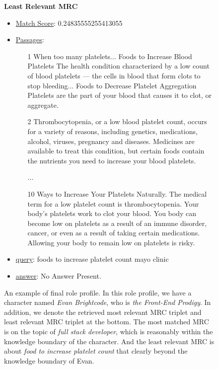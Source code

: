\begin{figure*}[!htbp]
\begin{tcolorbox}
\textbf{Least Relevant MRC}
\begin{itemize}
[leftmargin=*,noitemsep,topsep=0pt]
\item \underline{Match Score}: 0.24835555255413055
\item \underline{Passages}: 
    \begin{itemize}
    [leftmargin=*,noitemsep,topsep=0pt]
    \item [1] When too many platelets... Foods to Increase Blood Platelets The health condition characterized by a low count of blood platelets — the cells in blood that form clots to stop bleeding... Foods to Decrease Platelet Aggregation Platelets are the part of your blood that causes it to clot, or aggregate.
    \item [2] Thrombocytopenia, or a low blood platelet count, occurs for a variety of reasons, including genetics, medications, alcohol, viruses, pregnancy and diseases. Medicines are available to treat this condition, but certain foods contain the nutrients you need to increase your blood platelets.
    \item [\quad] ...
    \item [10] Ways to Increase Your Platelets Naturally. The medical term for a low platelet count is thrombocytopenia. Your body's platelets work to clot your blood. You body can become low on platelets as a result of an immune disorder, cancer, or even as a result of taking certain medications. Allowing your body to remain low on platelets is risky.
    \end{itemize}
\item \underline{query}: foods to increase platelet count mayo clinic
\item \underline{answer}: No Answer Present.
\end{itemize}

\end{tcolorbox}
\caption{An example of final role profile. In this role profile, we have a character named \emph{Evan Brightcode}, who is \emph{the Front-End Prodigy}. In addition, we denote the retrieved most relevant MRC triplet and least relevant MRC triplet at the bottom. The most matched MRC is on the topic of \emph{full stack developer}, which is reasonably within the knowledge boundary of the character. And the least relevant MRC is about \emph{food to increase platelet count} that clearly beyond the knowledge boundary of Evan.}
\label{box:role_profile}
\end{figure*}

